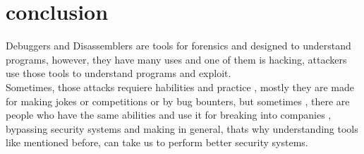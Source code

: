 \documentclass[10pt,a4paper]{article} %
\begin{document}
    \section{conclusion}
        Debuggers and Disassemblers  are tools for forensics and designed to
        understand programs, however, they have many uses and one of them is
        hacking, attackers use those tools to understand programs and exploit.
        \\ Sometimes, those attacks requiere habilities and practice , mostly
        they are made for making jokes or competitions or by bug bounters,
        but sometimes , there are people who have the same abilities and use it
        for breaking into companies , bypassing security systems and making
        in general, thats why understanding tools like mentioned before, can
        take us to perform better security systems.
























    \nocite{*}
    
    
\end{document}
